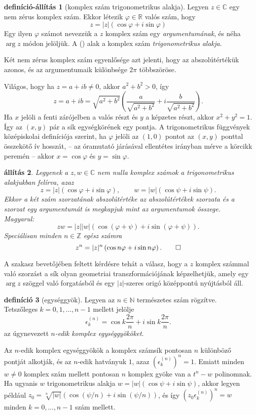 \documentclass[a4paper, showtrims]{memoir}
\makeatletter
\renewenvironment{proof}[1][\proofname]
    {\par\pushQED{\qed}%
    \normalfont \topsep6\p@\@plus6\p@\relax
    \trivlist
    \item[\hskip\labelsep
        \itshape
    #1\@addpunct{:}]\ignorespaces}
    {\popQED\endtrivlist\@endpefalse}
\theoremstyle{plain}
\newtheorem{proposition}{állítás}[chapter]
\theoremstyle{remark}
\theoremstyle{definition}
\newtheorem{definition}[proposition]{definíció}
\newtheorem{defprop}[proposition]{definíció-állítás}
\makeatother
\begin{document}
\begin{defprop}[komplex szám trigonometrikus alakja]
	Legyen $z\in \mathbb{C}$ egy nem zérus komplex szám.
	Ekkor létezik $\varphi\in\mathbb{R}$ valós szám, hogy
	\[
		z=
		|z|\left( \cos\varphi+i\sin\varphi \right)\tag{\dag}
	\]
	Egy ilyen $\varphi$ számot nevezzük a $z$ komplex szám egy \emph{argumentumának}, és néha $\arg z$ módon jelöljük.
	A (\dag) alak a komplex szám \emph{trigonometrikus alakja}.

	Két nem zérus komplex szám egyenlősége azt jelenti, hogy az abszolútértékük azonos,
	és az argumentumaik különbsége $2\pi$ többszöröse.
\end{defprop}
\begin{proof}
	Világos, hogy ha $z=a+ib\neq 0$, akkor $a^2+b^2>0$, így
	\[
		z=a+ib
		=
		\sqrt{a^2+b^2}\left( \frac{a}{\sqrt{a^2+b^2}}+i\frac{b}{\sqrt{a^2+b^2}} \right).
	\]
	Ha $x$ jelöli a fenti zárójelben a valós részt és $y$ a képzetes részt,
	akkor $x^2+y^2=1$.
	Így az $\left( x,y \right)$ pár a sík egységkörének egy pontja.
	A trigonometrikus függvények középiskolai definíciója szerint,
	ha $\varphi$ jelöli az $\left( 1,0 \right)$ pontot az $\left( x,y \right)$
	ponttal összekötő ív hosszát, -- az óramutató járásával ellentétes irányban mérve a körcikk peremén --
	akkor $x=\cos\varphi$ és $y=\sin\varphi$.
\end{proof}
\begin{proposition}
	Legyenek a $z,w\in \mathbb{C}$ nem nulla komplex számok a trigonometrikus alakjukban felírva,
	azaz
	\[
		z=|z|\left( \cos\varphi+i\sin\varphi \right),\qquad
		w=|w|\left( \cos\psi+i\sin\psi \right).
	\]
	Ekkor a két szám szorzatának abszolútértéke az abszolútértékek szorzata
	és a szorzat egy argumentumát is megkapjuk mint az argumentumok összege.
	Magyarul:
	\[
		zw=
		|z||w|\left( \cos\left( \varphi+\psi \right)+i\sin\left( \varphi+\psi \right) \right).
	\]
	Speciálisan minden $n\in\mathbb{Z}$ egész számra
	\[
		z^n=|z|^n\left( \cos n\varphi+i\sin n\varphi \right).\qedhere
	\]
\end{proposition}
A szakasz bevetőjében feltett kérdésre tehát a válasz,
hogy a $z$ komplex számmal való szorzást a sík olyan geometriai transzformációjának képzelhetjük,
amely egy $\arg z$ szöggel való forgatásból és egy $|z|$-szeres origó középpontú nyújtásból áll.
\begin{definition}[egységgyök]
	Legyen az $n\in\mathbb{N}$ természetes szám rögzítve.
	Tetszőleges $k=0,1,\ldots,n-1$ mellett jelölje
	\[
		\epsilon_k^{(n)}=\cos k\frac{2\pi}{n}+i\sin k\frac{2\pi}{n}.
	\]
	az úgynevezett \emph{$n$-edik komplex egységgyököket}.
\end{definition}
Az $n$-edik komplex egységgyökök a komplex számsík pontosan $n$ különböző pontját alkotják,
és az $n$-edik hatványuk $1$, azaz
$(\epsilon_k^{(n)})^n=1$.
Emiatt minden $w\neq 0$ komplex szám mellett pontosan $n$ komplex gyöke van a $t^n-w$ polinomnak.
Ha ugyanis $w$ trigonometrikus alakja $w=|w|\left( \cos\psi+i\sin\psi \right)$,
akkor legyen például $z_0=\sqrt[n]{|w|}\left( \cos(\psi/n)+i\sin(\psi/n) \right)$,
és így $(z_0\epsilon_k^{(n)})^n=w$ minden $k=0,\ldots,n-1$ szám mellett.
\end{document}
